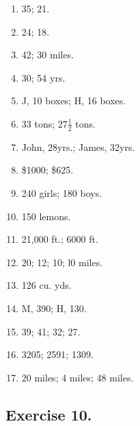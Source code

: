 \documentclass{book}
\begin{document}
\begin{enumerate}
 \item 35; 21.

\item 24; 18.

\item 42; 30 miles.

\item 30; 54 yrs.

\item J, 10 boxes; H, 16 boxes.

\item 33 tons; $27\frac{1}{2}$ tons.

\item John, 28yrs.; James, 32yrs.

\item \$1000; \$625.

\item 240 girls; 180 boys.

\item 150 lemons.

\item 21,000 ft.; 6000 ft.

\item 20; 12; 10; l0 miles.

\item 126 cu. yds.

\item M, 390; H, 130.

\item 39; 41; 32; 27.

\item 3205; 2591; 1309.

\item 20 miles; 4 miles; 48 miles.
\end{enumerate}

\subsection*{Exercise 10.}
\end{document}
